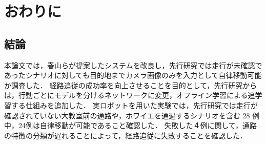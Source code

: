 \chapter{おわりに}
\label{chap:end}
\section{結論}
本論文では，春山らが提案したシステムを改良し，先行研究では走行が未確認であったシナリオに対しても目的地までカメラ画像のみを入力として自律移動可能か調査した．
経路追従の成功率を向上させることを目的として，先行研究からは，行動ごとにモデルを分けるネットワークに変更，オフライン学習による追学習する仕組みを追加した．
実ロボットを用いた実験では，先行研究では走行が確認されていない大教室前の通路や，ホワイエを通過するシナリオを含む 28 例中，24例は自律移動が可能であること確認した．
失敗した４例に関して，通路の特徴の分類が遅れることによって，経路追従に失敗することを確認した．